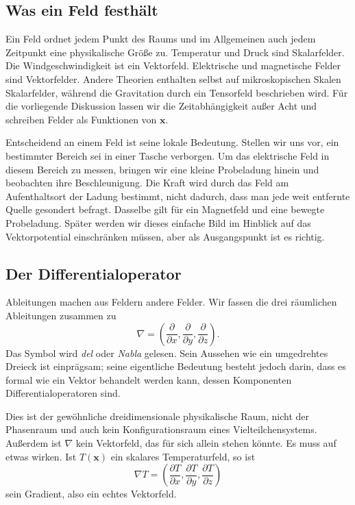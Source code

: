 \subsection{Was ein Feld festhält}

Ein Feld ordnet jedem Punkt des Raums und im Allgemeinen auch jedem Zeitpunkt eine physikalische Größe zu. Temperatur und Druck sind Skalarfelder. Die Windgeschwindigkeit ist ein Vektorfeld. Elektrische und magnetische Felder sind Vektorfelder. Andere Theorien enthalten selbst auf mikroskopischen Skalen Skalarfelder, während die Gravitation durch ein Tensorfeld beschrieben wird. Für die vorliegende Diskussion lassen wir die Zeitabhängigkeit außer Acht und schreiben Felder als Funktionen von \(\mathbf x\).

Entscheidend an einem Feld ist seine lokale Bedeutung. Stellen wir uns vor, ein bestimmter Bereich sei in einer Tasche verborgen. Um das elektrische Feld in diesem Bereich zu messen, bringen wir eine kleine Probeladung hinein und beobachten ihre Beschleunigung. Die Kraft wird durch das Feld am Aufenthaltsort der Ladung bestimmt, nicht dadurch, dass man jede weit entfernte Quelle gesondert befragt. Dasselbe gilt für ein Magnetfeld und eine bewegte Probeladung. Später werden wir dieses einfache Bild im Hinblick auf das Vektorpotential einschränken müssen, aber als Ausgangspunkt ist es richtig.

\subsection{Der Differentialoperator}

Ableitungen machen aus Feldern andere Felder. Wir fassen die drei räumlichen Ableitungen zusammen zu
\begin{equation}
  \nabla
  =
  \left(
    \frac{\partial}{\partial x},
    \frac{\partial}{\partial y},
    \frac{\partial}{\partial z}
  \right).
\end{equation}
Das Symbol wird \emph{del} oder \emph{Nabla} gelesen. Sein Aussehen wie ein umgedrehtes Dreieck ist einprägsam; seine eigentliche Bedeutung besteht jedoch darin, dass es formal wie ein Vektor behandelt werden kann, dessen Komponenten Differentialoperatoren sind.

Dies ist der gewöhnliche dreidimensionale physikalische Raum, nicht der Phasenraum und auch kein Konfigurationsraum eines Vielteilchensystems. Außerdem ist \(\nabla\) kein Vektorfeld, das für sich allein stehen könnte. Es muss auf etwas wirken. Ist \(T(\mathbf x)\) ein skalares Temperaturfeld, so ist
\begin{equation}
  \nabla T
  =
  \left(
    \frac{\partial T}{\partial x},
    \frac{\partial T}{\partial y},
    \frac{\partial T}{\partial z}
  \right)
\end{equation}
sein Gradient, also ein echtes Vektorfeld.

